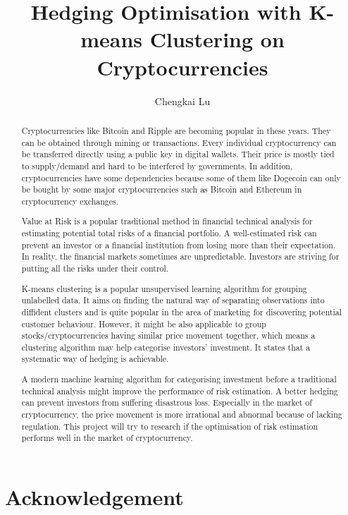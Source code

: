 \documentclass[11pt]{article} %
\title{Hedging Optimisation with K-means Clustering on Cryptocurrencies}
\author{Chengkai Lu}
\theoremstyle{plain}
\theoremstyle{definition}
\begin{document}
\maketitle

\declaration

\begin{abstract}
\thispagestyle{plain}
Cryptocurrencies like Bitcoin and Ripple are becoming popular in these years. They can be obtained through mining or transactions. Every individual cryptocurrency can be transferred directly using a public key in digital wallets. Their price is mostly tied to supply/demand and hard to be interfered by governments. In addition, cryptocurrencies have some dependencies because some of them like Dogecoin can only be bought by some major cryptocurrencies such as Bitcoin and Ethereum in cryptocurrency exchanges.

Value at Risk is a popular traditional method in financial technical analysis for estimating potential total risks of a financial portfolio. A well-estimated risk can prevent an investor or a financial institution from losing more than their expectation. In reality, the financial markets sometimes are unpredictable. Investors are striving for putting all the risks under their control.

K-means clustering is a popular unsupervised learning algorithm for grouping unlabelled data. It aims on finding the natural way of separating observations into diffident clusters and is quite popular in the area of marketing for discovering potential customer behaviour. However, it might be also applicable to group stocks/cryptocurrencies having similar price movement together, which means a clustering algorithm may help categorise investors' investment. It states that a systematic way of hedging is achievable.

A modern machine learning algorithm for categorising investment before a traditional technical analysis might improve the performance of risk estimation. A better hedging can prevent investors from suffering disastrous loss. Especially in the market of cryptocurrency, the price movement is more irrational and abnormal because of lacking regulation. This project will try to research if the optimisation of risk estimation performs well in the market of cryptocurrency.
\end{abstract}

\listoffigures
\listoftables
\setcounter{page}{4}

\clearpage

\section*{\hfil Acknowledgement \hfil}
\end{document}
